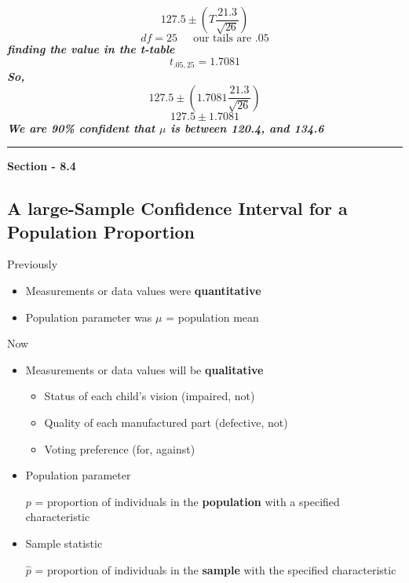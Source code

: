 \documentclass{report}
\begin{document}
$$  127.5 \pm \left(T \frac{21.3}{\sqrt{26}}\right)$$
$$ df = 25 \ \ \ \ \ \text{ our tails are .05}$$
\textit{\textbf{finding the value in the t-table}}
$$ t_{.05,25} = 1.7081$$
\textit{\textbf{So,}}
$$  127.5 \pm \left(1.7081 \frac{21.3}{\sqrt{26}}\right)$$
$$ 127.5 \pm{1.7081}$$
\bigbreak  \noindent
\textit{\textbf{We are 90\% confident that $\mu$ is between 120.4, and 134.6}}
\bigbreak \noindent
\hrule
\bigbreak \noindent
\begin{flushright}
  \textbf{\large{Section - 8.4}}
\end{flushright}
\vspace{-5mm}\subsection*{A large-Sample Confidence Interval for a Population Proportion}
\bigbreak \noindent
\begin{large}
\large{Previously}
\end{large}
\begin{itemize}[label=$\circ$]
  \item Measurements or data values were \textbf{quantitative}
  \item Population parameter was $\mu$ = population mean
\end{itemize}
\bigbreak \noindent
\begin{large}
 Now 
\end{large}
\begin{itemize}[label=$\circ$]
  \item Measurements or data values will be \textbf{qualitative} 
    \begin{itemize}[label=$\bullet$]
      \item Status of each child's vision (impaired, not)
      \item Quality of each manufactured part (defective, not)
      \item Voting preference (for, against)
    \end{itemize}
  \item Population parameter
    \begin{center}
      \hspace{-15mm}$p$ = proportion of individuals in the \textbf{population} with a specified characteristic 
    \end{center}
  \item Sample statistic
    \begin{center}
      \hspace{-20mm}$\hat{p}$ = proportion of individuals in the \textbf{sample} with the specified characteristic
    \end{center}
\end{itemize}
\bigbreak \noindent
\end{document}
